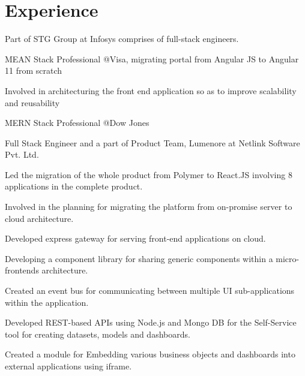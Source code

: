 \documentclass[]{ayush-gupta-resume-openfont}
\begin{document}
\begin{minipage}[t]{0.62\textwidth} 


\section{Experience}
\vspace{\topsep} %
\begin{tightemize}
\item Part of STG Group at Infosys comprises of full-stack engineers.
\item MEAN Stack Professional @Visa, migrating portal from Angular JS to Angular 11 from scratch
\item Involved in architecturing the front end application so as to improve scalability and reusability
\item MERN Stack Professional @Dow Jones
\end{tightemize}
\sectionsep

\vspace{\topsep} %
\begin{tightemize}
\item Full Stack Engineer and a part of Product Team, Lumenore at Netlink Software Pvt. Ltd.
\item Led the migration of the whole product from Polymer to React.JS involving 8 applications in the complete product.
\item Involved in the planning for migrating the platform from on-promise server to cloud architecture.
\item Developed express gateway for serving front-end applications on cloud.
\item Developing a component library for sharing generic components within a micro-frontends architecture.
\item Created an event bus for communicating between multiple UI sub-applications within the application.
\item Developed REST-based APIs using Node.js and Mongo DB for the Self-Service tool for creating datasets, models and dashboards.
\item Created a module for Embedding various business objects and dashboards into external applications using iframe.
\end{tightemize}
\sectionsep


\end{minipage}
\end{document}
